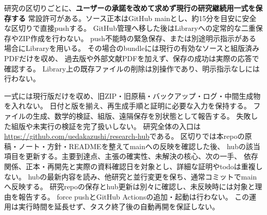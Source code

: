 \documentclass[11pt,a4paper]{ltjsarticle}
\begin{document}
研究の区切りごとに、\textbf{ユーザーの承諾を改めて求めず現行の研究継続用一式を保存する}
常設許可がある。ソース正本はGitHub mainとし、約15分を目安に安全な区切りで直接pushする。
GitHub管理へ移した後はLibraryへの定常的な二重保存やZIP作成を行わない。
push不能時の緊急保存、または別途明示指示がある場合にLibraryを用いる。
その場合のbundleには現行の有効なソースと組版済みPDFだけを収め、
過去版や外部文献PDFを加えず、保存の成功は実際の応答で確認する。
Library上の既存ファイルの削除は別操作であり、明示指示なしには行わない。

一式には現行版だけを収め、旧ZIP・旧原稿・バックアップ・ログ・中間生成物を入れない。
日付と版を揃え、再生成手順と証明に必要な入力を保持する。
ファイルの生成、数学的検証、組版、遠隔保存を別状態として報告する。
失敗した組版や未実行の検証を完了扱いしない。
研究全体の入口は\url{https://github.com/uedakazushi/research-hub}である。
区切りでは本repoの原稿・ノート・方針・READMEを整えてmainへの反映を確認した後、
hubの該当項目を更新する。主要到達点、主張の確実性、未解決の核心、次の一手、
依存関係、正本・再開先と実際の資料確認日を対象とし、詳細な証明やtodoは重複しない。
hubの最新内容を読み、他研究と並行変更を保ち、通常コミットでmainへ反映する。
研究repoの保存とhub更新は別々に確認し、未反映時には対象と理由を報告する。
force pushとGitHub Actionsの追加・起動は行わない。
この運用は実行時間を延長せず、タスク終了後の自動再開を保証しない。
\end{document}

